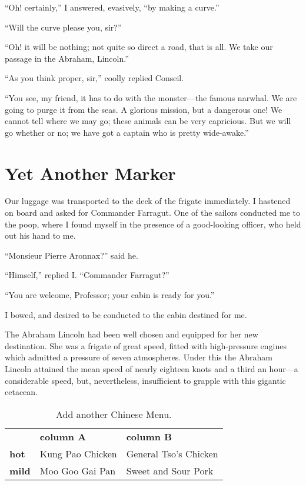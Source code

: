 ``Oh! certainly,'' I answered, evasively, ``by making a curve.''

``Will the curve please you, sir?''

``Oh! it will be nothing; not quite so direct a road, that is all.
We take our passage in the Abraham, Lincoln.''

``As you think proper, sir,'' coolly replied Conseil.

``You see, my friend, it has to do with the monster---the
famous narwhal.  We are going to purge it from the seas.
A glorious mission, but a dangerous one!  We cannot tell
where we may go; these animals can be very capricious.
But we will go whether or no; we have got a captain who
is pretty wide-awake.''

\section{Yet Another Marker}

Our luggage was transported to the deck of the frigate immediately.
I hastened on board and asked for Commander Farragut.
One of the sailors conducted me to the poop, where I found myself
in the presence of a good-looking officer, who held out his
hand to me.

``Monsieur Pierre Aronnax?'' said he.

``Himself,'' replied I. ``Commander Farragut?''

``You are welcome, Professor; your cabin is ready for you.''

I bowed, and desired to be conducted to the cabin destined for me.

The Abraham Lincoln had been well chosen and equipped
for her new destination.  She was a frigate of great speed,
fitted with high-pressure engines which admitted a pressure
of seven atmospheres.  Under this the Abraham Lincoln attained
the mean speed of nearly eighteen knots and a third an hour---a
considerable speed, but, nevertheless, insufficient to grapple
with this gigantic cetacean.

\vskip 0.25in
\begin{table}%
 \caption[Add another table]{Add another Chinese Menu.}
 \begin{center}%
  \begin{tabular}{lp{4.4cm}p{4.4cm}}
                & \textbf{column A} & \textbf{column B} \\
  \textbf{hot}  & Kung Pao Chicken  & General Tso's Chicken \\
  \textbf{mild} & Moo Goo Gai Pan   & Sweet and Sour Pork
  \end{tabular}
  \label{tab:test2}
 \end{center}
\end{table}

